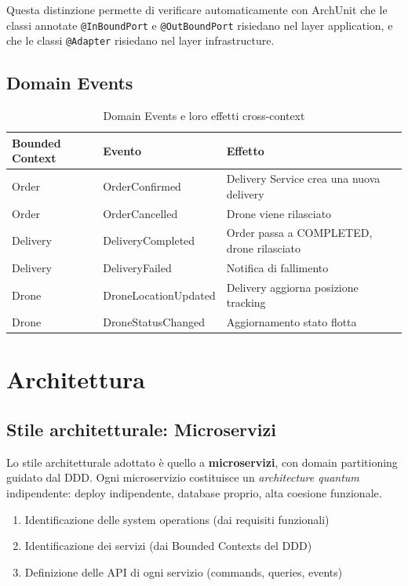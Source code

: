 \documentclass[12pt,a4paper]{article}
\begin{document}
Questa distinzione permette di verificare automaticamente con ArchUnit che le classi annotate \texttt{@InBoundPort} e \texttt{@OutBoundPort} risiedano nel layer application, e che le classi \texttt{@Adapter} risiedano nel layer infrastructure.

\subsection{Domain Events}

\begin{table}[H]
\centering
\begin{tabularx}{\textwidth}{llX}
\toprule
\textbf{Bounded Context} & \textbf{Evento} & \textbf{Effetto} \\
\midrule
Order & OrderConfirmed & Delivery Service crea una nuova delivery \\
Order & OrderCancelled & Drone viene rilasciato \\
Delivery & DeliveryCompleted & Order passa a COMPLETED, drone rilasciato \\
Delivery & DeliveryFailed & Notifica di fallimento \\
Drone & DroneLocationUpdated & Delivery aggiorna posizione tracking \\
Drone & DroneStatusChanged & Aggiornamento stato flotta \\
\bottomrule
\end{tabularx}
\caption{Domain Events e loro effetti cross-context}
\end{table}

\section{Architettura}

\subsection{Stile architetturale: Microservizi}

Lo stile architetturale adottato \`e quello a \textbf{microservizi}, con domain partitioning guidato dal DDD. Ogni microservizio costituisce un \textit{architecture quantum} indipendente: deploy indipendente, database proprio, alta coesione funzionale.

\begin{enumerate}
    \item Identificazione delle system operations (dai requisiti funzionali)
    \item Identificazione dei servizi (dai Bounded Contexts del DDD)
    \item Definizione delle API di ogni servizio (commands, queries, events)
\end{enumerate}
\end{document}
